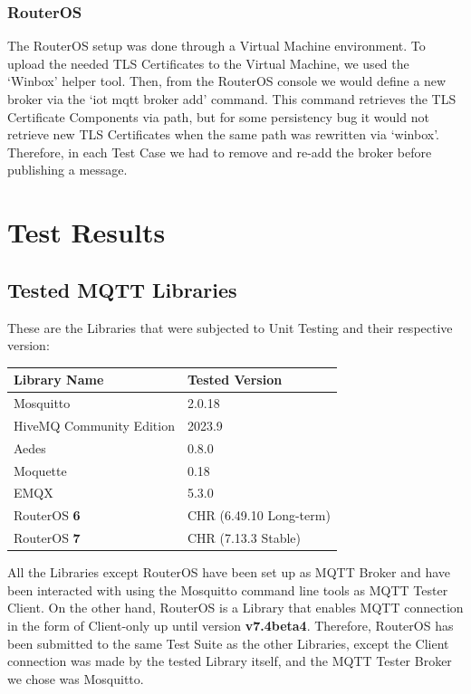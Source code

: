 \documentclass[binding=0.6cm,noexaminfo]{sapthesis}
\begin{document}
\subsection{RouterOS}
The RouterOS setup was done through a Virtual Machine environment. To upload the needed TLS Certificates to the Virtual Machine, we used the `Winbox' helper tool. Then, from the RouterOS console we would define a new broker via the `iot mqtt broker add' command. This command retrieves the TLS Certificate Components via path, but for some persistency bug it would not retrieve new TLS Certificates when the same path was rewritten via `winbox'. Therefore, in each Test Case we had to remove and re-add the broker before publishing a message.

\chapter{Test Results}
\section{Tested MQTT Libraries}
These are the Libraries that were subjected to Unit Testing and their respective version:

\begin{center}
\begin{tabular}{| p{6cm} | p{6cm} |}
\hline
\textbf{Library Name} & \textbf{Tested Version} \\
\hline
Mosquitto & 2.0.18 \\
\hline
HiveMQ Community Edition & 2023.9 \\
\hline
Aedes & 0.8.0 \\
\hline
Moquette & 0.18 \\
\hline
EMQX & 5.3.0 \\
\hline
RouterOS \textbf{6} & CHR (6.49.10 Long-term) \\
\hline
RouterOS \textbf{7} & CHR (7.13.3 Stable) \\
\hline
\end{tabular}
\end{center}

All the Libraries except RouterOS have been set up as MQTT Broker and have been interacted with using the Mosquitto command line tools as MQTT Tester Client. On the other hand, RouterOS is a Library that enables MQTT connection in the form of Client-only up until version \textbf{v7.4beta4}. Therefore, RouterOS has been submitted to the same Test Suite as the other Libraries, except the Client connection was made by the tested Library itself, and the MQTT Tester Broker we chose was Mosquitto.
\end{document}
